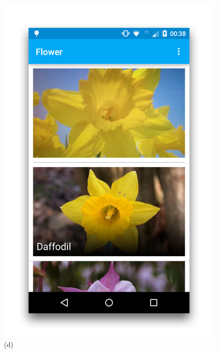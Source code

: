 \documentclass[11pt, a4paper]{report}
\begin{document}
\begin{figure}[h]
\begin{minipage}[b]{0.2\linewidth}
	\includegraphics[totalheight=6cm]{img/42.png}
	(d)
\end{minipage}
\begin{minipage}[b]{0.2\linewidth}
	\centering

\end{minipage}
\end{figure}
\end{document}
